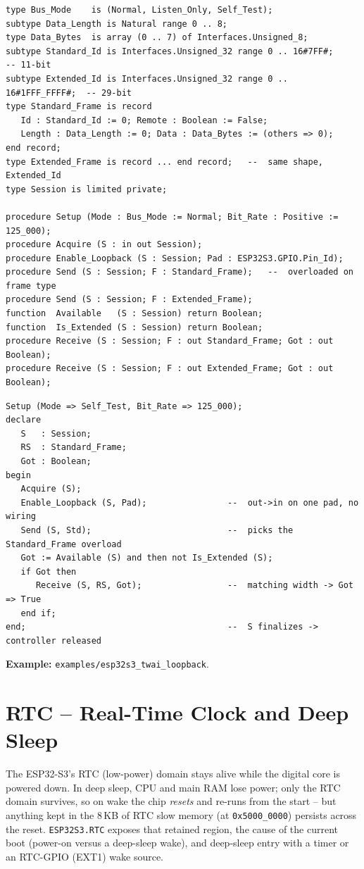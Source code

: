\begin{lstlisting}
type Bus_Mode    is (Normal, Listen_Only, Self_Test);
subtype Data_Length is Natural range 0 .. 8;
type Data_Bytes  is array (0 .. 7) of Interfaces.Unsigned_8;
subtype Standard_Id is Interfaces.Unsigned_32 range 0 .. 16#7FF#;        -- 11-bit
subtype Extended_Id is Interfaces.Unsigned_32 range 0 .. 16#1FFF_FFFF#;  -- 29-bit
type Standard_Frame is record
   Id : Standard_Id := 0; Remote : Boolean := False;
   Length : Data_Length := 0; Data : Data_Bytes := (others => 0);
end record;
type Extended_Frame is record ... end record;   --  same shape, Extended_Id
type Session is limited private;

procedure Setup (Mode : Bus_Mode := Normal; Bit_Rate : Positive := 125_000);
procedure Acquire (S : in out Session);
procedure Enable_Loopback (S : Session; Pad : ESP32S3.GPIO.Pin_Id);
procedure Send (S : Session; F : Standard_Frame);   --  overloaded on frame type
procedure Send (S : Session; F : Extended_Frame);
function  Available   (S : Session) return Boolean;
function  Is_Extended (S : Session) return Boolean;
procedure Receive (S : Session; F : out Standard_Frame; Got : out Boolean);
procedure Receive (S : Session; F : out Extended_Frame; Got : out Boolean);
\end{lstlisting}

\begin{lstlisting}
Setup (Mode => Self_Test, Bit_Rate => 125_000);
declare
   S   : Session;
   RS  : Standard_Frame;
   Got : Boolean;
begin
   Acquire (S);
   Enable_Loopback (S, Pad);                --  out->in on one pad, no wiring
   Send (S, Std);                           --  picks the Standard_Frame overload
   Got := Available (S) and then not Is_Extended (S);
   if Got then
      Receive (S, RS, Got);                 --  matching width -> Got => True
   end if;
end;                                        --  S finalizes -> controller released
\end{lstlisting}

\noindent\textbf{Example:} \texttt{examples/esp32s3\_twai\_loopback}.

\section{RTC -- Real-Time Clock and Deep Sleep}
\label{app:int:rtc}

The ESP32-S3's RTC (low-power) domain stays alive while the digital core is
powered down. In deep sleep, CPU and main RAM lose power; only the RTC domain
survives, so on wake the chip \emph{resets} and re-runs from the start -- but
anything kept in the 8\,KB of RTC slow memory (at \texttt{0x5000\_0000}) persists
across the reset. \texttt{ESP32S3.RTC} exposes that retained region, the cause of
the current boot (power-on versus a deep-sleep wake), and deep-sleep entry with a
timer or an RTC-GPIO (EXT1) wake source.


